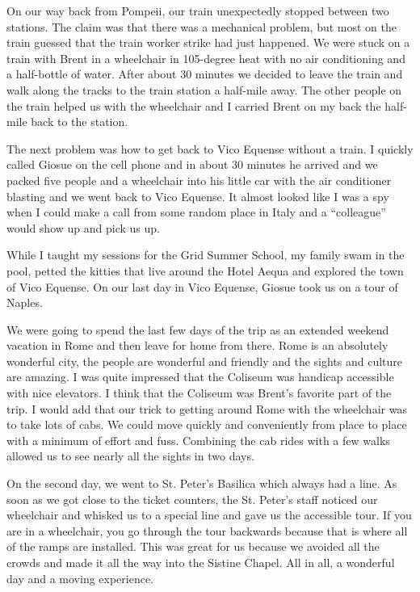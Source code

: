 \documentclass[12pt]{book}
\begin{document}
On our way back from Pompeii, our train
unexpectedly stopped
between two stations.  The claim was that
there was a mechanical problem, but most on the
train guessed that the train worker strike had just
happened.  We were stuck on a train with Brent
in a wheelchair in 105-degree heat with no air
conditioning and a half-bottle
of water.   After about 30 minutes we decided to leave
the train and walk along the tracks
to the train station a half-mile away.
The other people on the train helped us with the
wheelchair and I carried Brent on my back the half-mile
back to the station.

The next problem was how to get back to Vico Equense without
a train.  I quickly called Giosue on the cell phone and in
about 30 minutes he arrived and we packed five people
and a wheelchair into his little car with the air conditioner
blasting and we went back to Vico Equense.  It almost
looked like I was a spy when I could make a call
from some random place in Italy and a
``colleague'' would show up and pick us up.

While I taught my sessions for the Grid Summer School,
my family swam in the pool, petted the kitties that
live around the Hotel Aequa and explored the town
of Vico Equense.  On our last day in Vico Equense,
Giosue took us on a tour of Naples.

We were going to spend the last few days of
the trip as  an extended weekend vacation in Rome and
then leave for home from there.  Rome is an absolutely
wonderful city, the people
are wonderful and friendly and the sights and culture
are amazing.  I was quite impressed that the
Coliseum was handicap accessible with nice elevators.
I think that the Coliseum was Brent's favorite
part of the trip.  I would add that our trick to getting
around Rome with the wheelchair was to take lots of
cabs.  We could move quickly and conveniently from
place to place with a minimum of effort and fuss.
Combining the cab rides with a few walks allowed us
to see nearly all the sights in two days.


On the second day, we went to St. Peter's Basilica
which always had a line.  As soon as
we got close to the ticket counters, the St. Peter's
staff noticed our wheelchair and whisked us to
a special line and gave us the accessible tour.
If you are in a wheelchair, you go through
the tour backwards because that is where all of the
ramps are installed.  This was great for us because
we avoided all the crowds and made it all the way
into the Sistine Chapel.  All in all, a wonderful
day and a moving experience.
\end{document}
